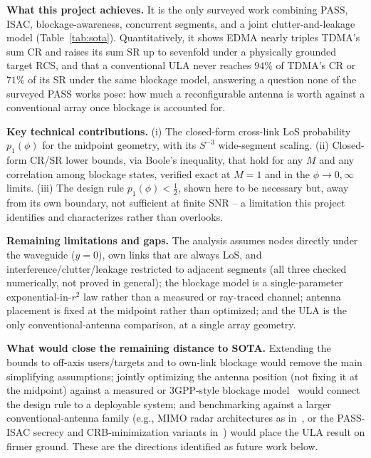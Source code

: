 \documentclass[11pt,a4paper]{article}
\begin{document}
\textbf{What this project achieves.} It is the only surveyed work combining PASS, ISAC, blockage-awareness, concurrent segments, and a joint clutter-and-leakage model (Table~\ref{tab:sota}). Quantitatively, it shows EDMA nearly triples TDMA's sum CR and raises its sum SR up to sevenfold under a physically grounded target RCS, and that a conventional ULA never reaches $94\%$ of TDMA's CR or $71\%$ of its SR under the same blockage model, answering a question none of the surveyed PASS works pose: how much a reconfigurable antenna is worth against a conventional array once blockage is accounted for.

\textbf{Key technical contributions.} (i) The closed-form cross-link LoS probability $p_1(\phi)$ for the midpoint geometry, with its $S^{-3}$ wide-segment scaling. (ii) Closed-form CR/SR lower bounds, via Boole's inequality, that hold for any $M$ and any correlation among blockage states, verified exact at $M=1$ and in the $\phi\to0,\infty$ limits. (iii) The design rule $p_1(\phi)<\tfrac12$, shown here to be necessary but, away from its own boundary, not sufficient at finite SNR -- a limitation this project identifies and characterizes rather than overlooks.

\textbf{Remaining limitations and gaps.} The analysis assumes nodes directly under the waveguide ($y=0$), own links that are always LoS, and interference/clutter/leakage restricted to adjacent segments (all three checked numerically, not proved in general); the blockage model is a single-parameter exponential-in-$r^2$ law rather than a measured or ray-traced channel; antenna placement is fixed at the midpoint rather than optimized; and the ULA is the only conventional-antenna comparison, at a single array geometry.

\textbf{What would close the remaining distance to SOTA.} Extending the bounds to off-axis users/targets and to own-link blockage would remove the main simplifying assumptions; jointly optimizing the antenna position (not fixing it at the midpoint) against a measured or 3GPP-style blockage model~\cite{3GPP38901} would connect the design rule to a deployable system; and benchmarking against a larger conventional-antenna family (e.g., MIMO radar architectures as in~\cite{CRB2026}, or the PASS-ISAC secrecy and CRB-minimization variants in~\cite{Zhang2025ISACPASS}) would place the ULA result on firmer ground. These are the directions identified as future work below.
\end{document}
